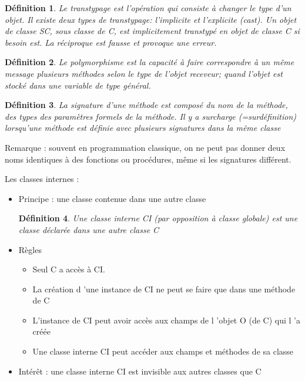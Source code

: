 \documentclass{article}
\newtheorem{definition}{Définition}
\begin{document}
\begin{definition}
	Le transtypage est l'opération qui consiste à changer le type d'un objet. 
	Il existe deux types de transtypage: l’implicite et l’explicite (cast).
	Un objet de classe SC, sous classe de C, est implicitement transtypé en 
	objet de classe C si besoin est. 
	La réciproque est fausse et provoque une erreur.
\end{definition}

\begin{definition}
	Le polymorphisme est la capacité à faire correspondre à un même
message plusieurs méthodes selon le type de l'objet receveur; quand
l’objet est stocké dans une variable de type général.
\end{definition}

\begin{definition}
	La signature d'une méthode est composé du nom de la méthode, des
types des paramètres formels de la méthode.
Il y a surcharge (=surdéfinition) lorsqu’une méthode est définie avec
plusieurs signatures dans la même classe
\end{definition}

Remarque : souvent en programmation classique, on ne peut pas donner
deux noms identiques à des fonctions ou procédures, même si les
signatures différent.

Les classes internes :
\begin{itemize}
	\item Principe : une classe contenue dans une autre classe	
	\begin{definition}
		Une classe interne CI (par opposition à classe globale) est une classe déclarée
dans une autre classe C	
	\end{definition}
	\item Règles
	\begin{itemize}
		\item Seul C a accès à CI.
		\item La création d ’une instance de CI ne peut se faire que dans une méthode de C
		\item L’instance de CI peut avoir accès aux champs de l ’objet O (de C) qui l ’a créée
		\item Une classe interne CI peut accéder aux champs et méthodes de sa classe
	\end{itemize}
	\item Intérêt : une classe interne CI est invisible aux autres classes que C
\end{itemize}
\end{document}
